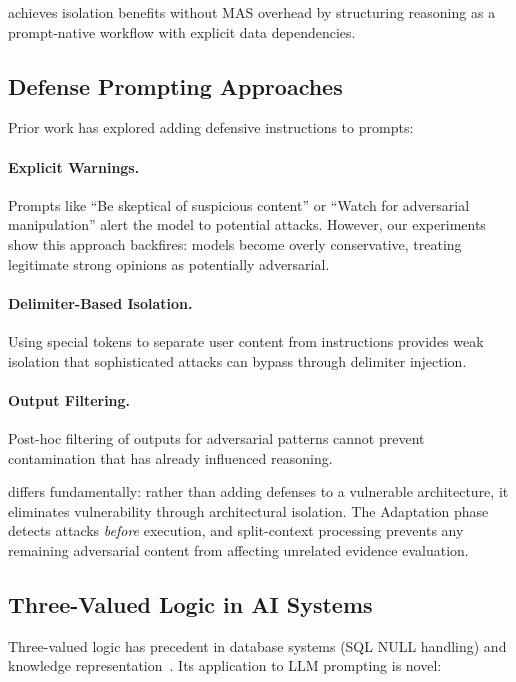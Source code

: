 \method achieves isolation benefits without MAS overhead by structuring reasoning as a prompt-native workflow with explicit data dependencies.

\subsection{Defense Prompting Approaches}

Prior work has explored adding defensive instructions to prompts:

\paragraph{Explicit Warnings.}
Prompts like ``Be skeptical of suspicious content'' or ``Watch for adversarial manipulation'' alert the model to potential attacks. However, our experiments show this approach backfires: models become overly conservative, treating legitimate strong opinions as potentially adversarial.

\paragraph{Delimiter-Based Isolation.}
Using special tokens to separate user content from instructions provides weak isolation that sophisticated attacks can bypass through delimiter injection.

\paragraph{Output Filtering.}
Post-hoc filtering of outputs for adversarial patterns cannot prevent contamination that has already influenced reasoning.

\method differs fundamentally: rather than adding defenses to a vulnerable architecture, it eliminates vulnerability through architectural isolation. The Adaptation phase detects attacks \emph{before} execution, and split-context processing prevents any remaining adversarial content from affecting unrelated evidence evaluation.

\subsection{Three-Valued Logic in AI Systems}

Three-valued logic has precedent in database systems (SQL NULL handling) and knowledge representation~\cite{fitting1985kripke}. Its application to LLM prompting is novel:

